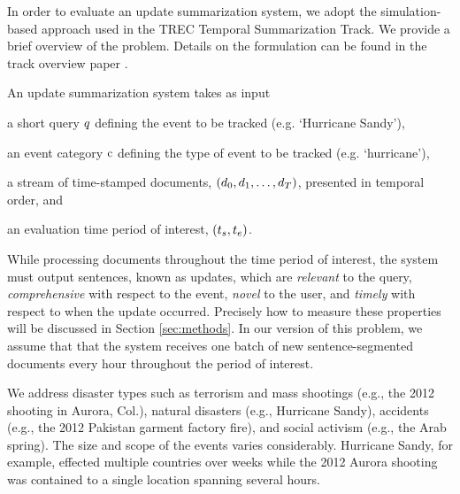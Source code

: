 \label{sec:problemdefinition}
In order to evaluate an update summarization system, we adopt the simulation-based approach used in the TREC Temporal Summarization Track.  We provide a brief overview of the problem.  Details on the formulation can be found in the track overview paper \cite{aslam2013trec}.  

An update summarization system takes as input 
\begin{enumerate*}[label=\itshape\alph*\upshape)]
  \item a short query $q$ defining the event to be tracked (e.g. `Hurricane Sandy'), 
  \item an event category $\operatorname{c}$ defining the type of event to be tracked (e.g. `hurricane'), 
  \item a stream of time-stamped documents, $(\operatorname{\mathnormal{d}}_0, \operatorname{\mathnormal{d}}_1,\ldots,\operatorname{\mathnormal{d}}_T)$,
  presented in temporal order, and \item an evaluation time period of interest,
      $(t_s,t_e)$.  \end{enumerate*} While processing documents
      throughout the time period of interest, the system must output sentences,
      known as updates, which are \emph{relevant} to the query,
      \emph{comprehensive} with respect to the event, \emph{novel} to the user,
      and \emph{timely} with respect to when the update occurred.  Precisely
      how to measure these properties will be discussed in Section
      \ref{sec:methods}.  In our version of this problem, we assume that that
      the system receives one batch of new sentence-segmented documents every
      hour throughout the period of interest.

We address disaster types such as terrorism and mass shootings (e.g., the 2012
shooting in Aurora, Col.), natural disasters (e.g., Hurricane Sandy), accidents
(e.g., the 2012 Pakistan garment factory fire), and social activism (e.g., the
Arab spring). The size and scope of the events varies considerably. Hurricane
Sandy, for example, effected multiple countries over weeks while the
2012 Aurora shooting was contained to a single location spanning several hours.


